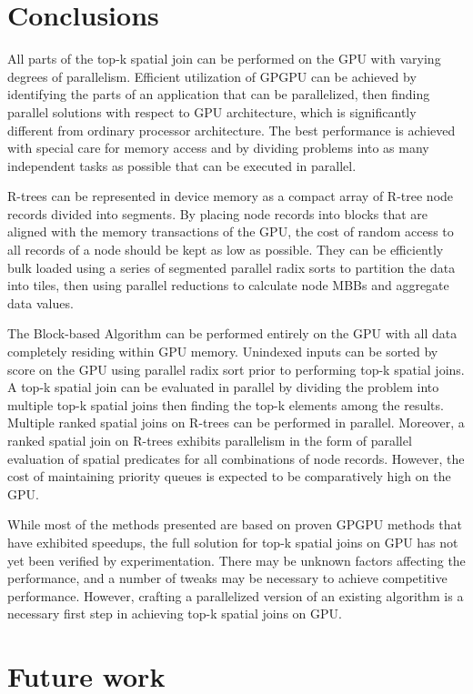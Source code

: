 \section{Conclusions}

All parts of the top-k spatial join can be performed on the GPU with varying degrees of parallelism. Efficient utilization of GPGPU can be achieved by identifying the parts of an application that can be parallelized, then finding parallel solutions with respect to GPU architecture, which is significantly different from ordinary processor architecture. The best performance is achieved with special care for memory access and by dividing problems into as many independent tasks as possible that can be executed in parallel.

R-trees can be represented in device memory as a compact array of R-tree node records divided into segments. By placing node records into blocks that are aligned with the memory transactions of the GPU, the cost of random access to all records of a node should be kept as low as possible. They can be efficiently bulk loaded using a series of segmented parallel radix sorts to partition the data into tiles, then using parallel reductions to calculate node MBBs and aggregate data values.

The Block-based Algorithm can be performed entirely on the GPU with all data completely residing within GPU memory. Unindexed inputs can be sorted by score on the GPU using parallel radix sort prior to performing top-k spatial joins. A top-k spatial join can be evaluated in parallel by dividing the problem into multiple top-k spatial joins then finding the top-k elements among the results. Multiple ranked spatial joins on R-trees can be performed in parallel. Moreover, a ranked spatial join on R-trees exhibits parallelism in the form of parallel evaluation of spatial predicates for all combinations of node records. However, the cost of maintaining priority queues is expected to be comparatively high on the GPU.

While most of the methods presented are based on proven GPGPU methods that have exhibited speedups, the full solution for top-k spatial joins on GPU has not yet been verified by experimentation. There may be unknown factors affecting the performance, and a number of tweaks may be necessary to achieve competitive performance. However, crafting a parallelized version of an existing algorithm is a necessary first step in achieving top-k spatial joins on GPU.

\section{Future work}

